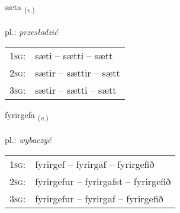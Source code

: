 \documentclass[frontgrid, backgrid]{flacards}\usepackage[]{graphicx}\usepackage[]{xcolor}
\begin{document}
\renewcommand{\flhead}{\vskip5pt \fboxsep=0pt {\small\bfseries\footnotesize Sagnorð | czasownik}}
\renewcommand{\fcfoot}{\vskip5pt \fboxsep=0pt \hspace{2pt}{\small\bfseries\footnotesize 3K}}

\renewcommand{\blhead}{\vskip5pt {\small\bfseries\footnotesize Sagnorð | czasownik }}
\renewcommand{\bcfoot}{\vskip5pt \hspace{2pt}{\small\bfseries\footnotesize 3K}}


{sæta \small{\textsubscript{(\textit{v.})}} \\[1ex] %
\textphonetic{[saiːta]} \\
pl.: \emph{przesłodzić} \\  [2ex]
\renewcommand*{\arraystretch}{0.8}
\begin{tabular}{p{1cm}l}
\textsc{1sg}: & sæti -- sætti -- sætt \\ 
\textsc{2sg}: & sætir -- sættir -- sætt \\ 
\textsc{3sg}: & sætir -- sætti -- sætt \\ 
\end{tabular}
}

\renewcommand{\flhead}{\vskip5pt \fboxsep=0pt {\small\bfseries\footnotesize Sagnorð | czasownik}}
\renewcommand{\fcfoot}{\vskip5pt \fboxsep=0pt \hspace{2pt}{\small\bfseries\footnotesize 3K}}

\renewcommand{\blhead}{\vskip5pt {\small\bfseries\footnotesize Sagnorð | czasownik }}
\renewcommand{\bcfoot}{\vskip5pt \hspace{2pt}{\small\bfseries\footnotesize 3K}}


{fyrirgefa \small{\textsubscript{(\textit{v.})}} \\[1ex] %
\textphonetic{[fɪːrɪrcɛva]} \\
pl.: \emph{wybaczyć} \\  [2ex]
\renewcommand*{\arraystretch}{0.8}
\begin{tabular}{p{1cm}l}
\textsc{1sg}: & fyrirgef -- fyrirgaf -- fyrirgefið \\ 
\textsc{2sg}: & fyrirgefur -- fyrirgafst -- fyrirgefið \\ 
\textsc{3sg}: & fyrirgefur -- fyrirgaf -- fyrirgefið \\ 
\end{tabular}
}
\end{document}
